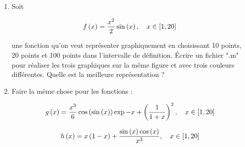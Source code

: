 \begin{enumerate}
  \item Soit
  
  \begin{equation*}
    f \left(x\right) = \dfrac{x^{2}}{2} \sin \left(x\right), 
    \quad x \in \left[1, 20\right]
  \end{equation*}
  
  une fonction qu'on veut représenter graphiquement en choisissant 10 points, 20 points et 100 points dans l'intervalle de définition. Écrire un fichier ".m" pour réaliser les trois graphiques sur la même figure et avec trois couleurs différentes. Quelle est la meilleure représentation ?
  
  \item Faire la même chose pour les fonctions :
  
  \begin{equation*}
    g \left(x\right) = \dfrac{x^{3}}{6} \cos \left(\sin \left(x\right)\right) \exp{-x} + \left(\dfrac{1}{1+x}\right)^{2}, 
    \quad x \in \left[1, 20\right]
  \end{equation*}
  
  \begin{equation*}
    h \left(x\right) = x \left(1 - x\right) + \dfrac{\sin \left(x\right) \cos \left(x\right)}{x^3},
    \quad x \in \left[1, 20\right]
  \end{equation*}
\end{enumerate}



